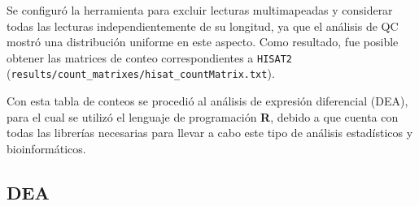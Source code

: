 \documentclass[
  10pt,
]{article}
\begin{document}
Se configuró la herramienta para excluir lecturas multimapeadas y
considerar todas las lecturas independientemente de su longitud, ya que
el análisis de QC mostró una distribución uniforme en este aspecto. Como
resultado, fue posible obtener las matrices de conteo correspondientes a
\texttt{HISAT2}
(\texttt{results/count\_matrixes/hisat\_countMatrix.txt}).

\begin{table}[htbp]
\centering
\scriptsize
{}
\caption{Matriz de conteos hisat2 limpia y con los nombres de las muestras srr asignados }
\end{table}

Con esta tabla de conteos se procedió al análisis de expresión
diferencial (DEA), para el cual se utilizó el lenguaje de programación
\textbf{R}, debido a que cuenta con todas las librerías necesarias para
llevar a cabo este tipo de análisis estadísticos y bioinformáticos.

\subsection{DEA}\label{dea}
\end{document}
